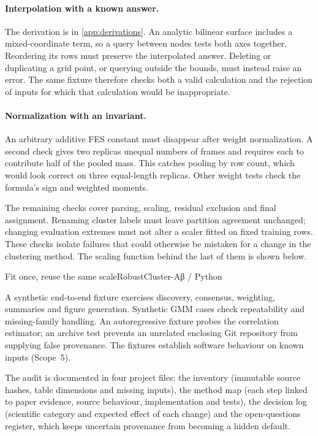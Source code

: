 \paragraph{Interpolation with a known answer.}
The derivation is in \cref{app:derivations}. An analytic bilinear surface includes a mixed-coordinate term, so a query between nodes tests both axes together. Reordering its rows must preserve the interpolated answer. Deleting or duplicating a grid point, or querying outside the bounds, must instead raise an error. The same fixture therefore checks both a valid calculation and the rejection of inputs for which that calculation would be inappropriate.

\paragraph{Normalization with an invariant.}
An arbitrary additive FES constant must disappear after weight normalization. A second check gives two replicas unequal numbers of frames and requires each to contribute half of the pooled mass. This catches pooling by row count, which would look correct on three equal-length replicas. Other weight tests check the formula's sign and weighted moments.

The remaining checks cover parsing, scaling, residual exclusion and final assignment. Renaming cluster labels must leave partition agreement unchanged; changing evaluation extremes must not alter a scaler fitted on fixed training rows. These checks isolate failures that could otherwise be mistaken for a change in the clustering method. The scaling function behind the last of them is shown below.

\begin{codepanel}{Fit once, reuse the same scale}{RobustCluster-Aβ / Python}

\end{codepanel}

A synthetic end-to-end fixture exercises discovery, consensus, weighting, summaries and figure generation. Synthetic GMM cases check repeatability and missing-family handling. An autoregressive fixture probes the correlation estimator; an archive test prevents an unrelated enclosing Git repository from supplying false provenance. The fixtures establish software behaviour on known inputs (Scope~5).

The audit is documented in four project files: the inventory (immutable source hashes, table dimensions and missing inputs), the method map (each step linked to paper evidence, source behaviour, implementation and tests), the decision log (scientific category and expected effect of each change) and the open-questions register, which keeps uncertain provenance from becoming a hidden default.

